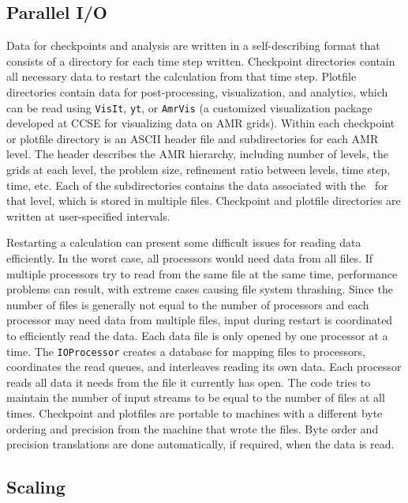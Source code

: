 \subsection{Parallel I/O}

Data for checkpoints and analysis are written in a self-describing format that consists 
of a directory for each time step written. Checkpoint directories contain all necessary 
data to restart the calculation from that time step. Plotfile directories contain data 
for post-processing, visualization, and analytics, which can be read using {\tt VisIt}, {\tt yt}, or
{\tt AmrVis} (a customized visualization package developed at CCSE for visualizing 
data on AMR grids).  Within each checkpoint or plotfile directory is an ASCII header file and 
subdirectories for each AMR level.  The header describes the AMR hierarchy, including 
number of levels, the grids at each level, the problem size, refinement ratio 
between levels, time step, time, etc.  Each of the subdirectories contains the data 
associated with the \MultiFab\ for that level, which is stored in multiple files.
Checkpoint and plotfile directories are written at user-specified intervals. 

Restarting a calculation can present some difficult issues for reading data efficiently. 
In the worst case, all processors would need data from all files. If multiple processors 
try to read from the same file at the same time, performance problems can result, with 
extreme cases causing file system thrashing. Since the number of files is generally not 
equal to the number of processors and each processor may need data from multiple files, 
input during restart is coordinated to efficiently read the data. Each data file is only 
opened by one processor at a time. The {\tt IOProcessor} creates a database for mapping files 
to processors, coordinates the read queues, and interleaves reading its own data. Each 
processor reads all data it needs from the file it currently has open. The code tries to 
maintain the number of input streams to be equal to the number of files at all times. 
Checkpoint and plotfiles are portable to machines with a different byte ordering and 
precision from the machine that wrote the files. Byte order and precision translations 
are done automatically, if required, when the data is read.

\subsection{Scaling}

